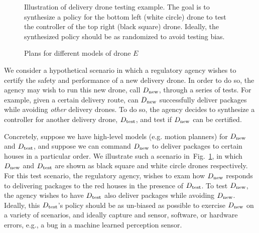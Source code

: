 
\begin{figure}
  \centering {}
  \caption{ Illustration of delivery drone testing example. The goal
    is to synthesize a policy for the bottom left (white circle) drone
    to test the controller of the top right (black square) drone. Ideally,
    the synthesized policy should be as randomized to avoid testing bias.\label{fig:motivating} }
\end{figure}

\begin{figure*}

\caption{Plans for different models of drone $E$}	
\end{figure*}

We consider a hypothetical scenario in which a regulatory agency
wishes to certify the safety and performance of a new delivery drone.
In order to do so, the agency may wish to run this new drone, call
${D_{\text{new}}}$, through a series of tests. For example, given a certain
delivery route, can ${D_{\text{new}}}$ successfully deliver packages while
avoiding \emph{other} delivery drones. To do so, the agency decides to
synthesize a controller for another delivery drone, ${D_{\text{test}}}$, and test if
${D_{\text{new}}}$ can be certified.

Concretely, suppose we have high-level models (e.g. motion planners)
for ${D_{\text{new}}}$ and ${D_{\text{test}}}$, and suppose we can command
${D_{\text{new}}}$ to deliver packages to certain houses in a particular
order. We illustrate such a scenario in~Fig.~\ref{fig:motivating}, in
which ${D_{\text{new}}}$ and ${D_{\text{test}}}$ are shown as black square and white
circle drones respectively.  For this test scenario, the regulatory
agency, wishes to exam how ${D_{\text{new}}}$ responds to delivering packages
to the red houses in the presence of ${D_{\text{test}}}$. To test ${D_{\text{new}}}$,
the agency wishes to have ${D_{\text{test}}}$ also deliver packages while
avoiding ${D_{\text{new}}}$.  Ideally, this ${D_{\text{test}}}$'s policy should be as
un-biased as possible to exercise ${D_{\text{new}}}$ on a variety of
scenarios, and ideally capture and sensor, software, or hardware
errors, e.g., a bug in a machine learned perception sensor.




